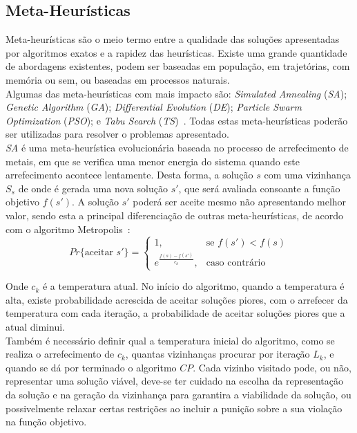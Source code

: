 \subsection{Meta-Heurísticas}

Meta-heurísticas são o meio termo entre a qualidade das soluções apresentadas por algoritmos exatos e a rapidez das heurísticas. Existe uma grande quantidade de abordagens existentes, podem ser baseadas em população, em trajetórias, com memória ou sem, ou baseadas em processos naturais.\\
Algumas das meta-heurísticas com mais impacto são: \textit{Simulated Annealing} (\textit{SA}); \textit{Genetic Algorithm} (\textit{GA}); \textit{Differential Evolution} (\textit{DE}); \textit{Particle Swarm Optimization} (\textit{PSO}); e \textit{Tabu Search} (\textit{TS})~\cite{ezugwuMetaheuristicsComprehensiveOverview2021}. Todas estas meta-heurísticas poderão ser utilizadas para resolver o problemas apresentado.\\

\textit{SA} é uma meta-heurística evolucionária baseada no processo de arrefecimento de metais, em que se verifica uma menor energia do sistema quando este arrefecimento acontece lentamente. Desta forma, a solução $s$ com uma vizinhança $S_{s}$ de onde é gerada uma nova solução $s'$, que será avaliada consoante a função objetivo $f(s')$. A solução $s'$ poderá ser aceite mesmo não apresentando melhor valor, sendo esta a principal diferenciação de outras meta-heurísticas, de acordo com o algoritmo Metropolis~\cite{metropolisEquationStateCalculations1953}:
$$
Pr\{\text{aceitar } s'\}= 
\begin{cases}
	1                         ,& \text{se } f(s')<f(s)\\
    e^{\frac{f(s)-f(s')}{c_{k}}},& \text{caso contrário}
\end{cases}
$$

Onde $c_{k}$ é a temperatura atual. No início do algoritmo, quando a temperatura é alta, existe probabilidade acrescida de aceitar soluções piores, com o arrefecer da temperatura com cada iteração, a probabilidade de aceitar soluções piores que a atual diminui.\\
Também é necessário definir qual a temperatura inicial do algoritmo, como se realiza o arrefecimento de $c_{k}$, quantas vizinhanças procurar por iteração $L_{k}$, e quando se dá por terminado o algoritmo $CP$. Cada vizinho visitado pode, ou não, representar uma solução viável, deve-se ter cuidado na escolha da representação da solução e na geração da vizinhança para garantira a viabilidade da solução, ou possivelmente relaxar certas restrições ao incluir a punição sobre a sua violação na função objetivo.\\

